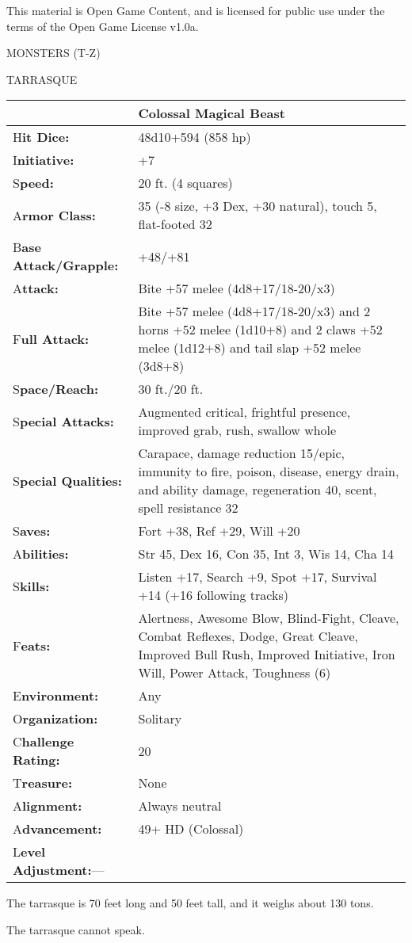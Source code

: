 \documentclass{article}
\begin{document}
This material is Open Game Content, and is licensed for public use under the terms 
of the Open Game License v1.0a.

{\LARGE{}MONSTERS (T-Z)}

\vspace{12pt}
{\LARGE{}TARRASQUE}

\begin{tabular}{|>{\raggedright}p{87pt}|>{\raggedright}p{238pt}|}
\hline
  & Colossal Magical Beast\tabularnewline
\hline
H\textbf{it Dice:} & 48d10+594 (858 hp)\tabularnewline
\hline
I\textbf{nitiative:} & +7\tabularnewline
\hline
S\textbf{peed:} & 20 ft. (4 squares)\tabularnewline
\hline
A\textbf{rmor Class:} & 35 (-8 size, +3 Dex, +30 natural), touch 5, flat-footed 
32\tabularnewline
\hline
B\textbf{ase Attack/Grapple:} & +48/+81\tabularnewline
\hline
A\textbf{ttack:} & Bite +57 melee (4d8+17/18-20/x3)\tabularnewline
\hline
F\textbf{ull Attack:} & Bite +57 melee (4d8+17/18-20/x3) and 2 horns +52 melee 
(1d10+8) and 2 claws +52 melee (1d12+8) and tail slap +52 melee (3d8+8)\tabularnewline
\hline
S\textbf{pace/Reach:} & 30 ft./20 ft.\tabularnewline
\hline
S\textbf{pecial Attacks:} & Augmented critical, frightful presence, improved grab, 
rush, swallow whole\tabularnewline
\hline
S\textbf{pecial Qualities:} & Carapace, damage reduction 15/epic, immunity to fire, 
poison, disease, energy drain, and ability damage, regeneration 40, scent, spell 
resistance 32\tabularnewline
\hline
S\textbf{aves:} & Fort +38, Ref +29, Will +20\tabularnewline
\hline
A\textbf{bilities:} & Str 45, Dex 16, Con 35, Int 3, Wis 14, Cha 14\tabularnewline
\hline
S\textbf{kills:} & Listen +17, Search +9, Spot +17, Survival +14 (+16 following 
tracks)\tabularnewline
\hline
F\textbf{eats:} & Alertness, Awesome Blow, Blind-Fight, Cleave, Combat Reflexes, 
Dodge, Great Cleave, Improved Bull Rush, Improved Initiative, Iron Will, Power 
Attack, Toughness (6)\tabularnewline
\hline
E\textbf{nvironment:} & Any\tabularnewline
\hline
O\textbf{rganization:} & Solitary\tabularnewline
\hline
C\textbf{hallenge Rating:} & 20\tabularnewline
\hline
T\textbf{reasure:} & None\tabularnewline
\hline
A\textbf{lignment:} & Always neutral\tabularnewline
\hline
A\textbf{dvancement:} & 49+ HD (Colossal)\tabularnewline
\hline
L\textbf{evel Adjustment:}--- & \tabularnewline
\hline
\end{tabular}

The tarrasque is 70 feet long and 50 feet tall, and it weighs about 130 tons.

The tarrasque cannot speak.
\end{document}
